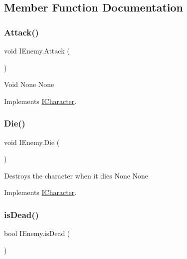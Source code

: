 \subsection{Member Function Documentation}
\mbox{\label{class_i_enemy_aa7214edc7d35f1684009bba6f34387b7}} 
\subsubsection{\texorpdfstring{Attack()}{Attack()}}
{\footnotesize\ttfamily void I\+Enemy.\+Attack (\begin{DoxyParamCaption}{ }\end{DoxyParamCaption})\hspace{0.3cm}{\ttfamily [inline]}}

Void  None  None 

Implements \mbox{\hyperlink{interface_i_character}{I\+Character}}.

\mbox{\label{class_i_enemy_a53c76db616e0e102f1ddd3cfe2c8ed28}} 
\subsubsection{\texorpdfstring{Die()}{Die()}}
{\footnotesize\ttfamily void I\+Enemy.\+Die (\begin{DoxyParamCaption}{ }\end{DoxyParamCaption})\hspace{0.3cm}{\ttfamily [inline]}}

Destroys the character when it dies  None  None 

Implements \mbox{\hyperlink{interface_i_character_ad58356e457f98d8a6f9548da446012ce}{I\+Character}}.

\mbox{\label{class_i_enemy_ab4b9b90ff23a48388ba9fb3fd794a282}} 
\subsubsection{\texorpdfstring{is\+Dead()}{isDead()}}
{\footnotesize\ttfamily bool I\+Enemy.\+is\+Dead (\begin{DoxyParamCaption}{ }\end{DoxyParamCaption})\hspace{0.3cm}{\ttfamily [inline]}}

